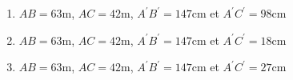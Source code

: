 \documentclass[oneside,twoside]{book}
\begin{document}
\begin{enumerate}
\begin{enumerate}

\item\BonneReponse $AB=63\mathrm{m}$, $AC=42\mathrm{m}$, $A^{\prime}B^{\prime}=147\mathrm{cm}$ et $A^{\prime}C^{\prime}=98\mathrm{cm}$

\item\MauvaiseReponse $AB=63\mathrm{m}$, $AC=42\mathrm{m}$, $A^{\prime}B^{\prime}=147\mathrm{cm}$ et $A^{\prime}C^{\prime}=18\mathrm{cm}$

\item\MauvaiseReponse $AB=63\mathrm{m}$, $AC=42\mathrm{m}$, $A^{\prime}B^{\prime}=147\mathrm{cm}$ et $A^{\prime}C^{\prime}=27\mathrm{cm}$

\end{enumerate}


\end{enumerate}
\end{document}
